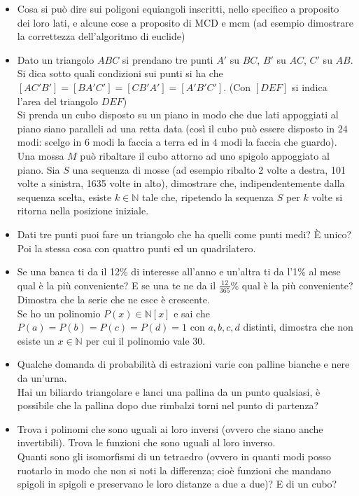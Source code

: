 \documentclass[a4paper,11pt]{article}
\newcommand{\NN}{\mathbb{N}}
\begin{document}
\begin{itemize}
\item Cosa si pu\`o dire sui poligoni equiangoli inscritti, nello specifico a proposito dei loro lati, e alcune cose a proposito di MCD e mcm (ad esempio dimostrare la correttezza dell'algoritmo di euclide)
\item Dato un triangolo $ABC$ si prendano tre punti $A'$ su $BC$, $B'$ su $AC$, $C'$ su $AB$. Si dica sotto quali condizioni sui punti si ha che $[AC'B']=[BA'C']=[CB'A']=[A'B'C']$. (Con $[DEF]$ si indica l'area del triangolo $DEF$) \\ Si prenda un cubo disposto su un piano in modo che due lati appoggiati al piano siano paralleli ad una retta data (cos\`i il cubo pu\`o essere disposto in $24$ modi: scelgo in $6$ modi la faccia a terra ed in $4$ modi la faccia che guardo). Una mossa $M$ pu\`o ribaltare il cubo attorno ad uno spigolo appoggiato al piano. Sia $S$ una sequenza di mosse (ad esempio ribalto 2 volte a destra, 101 volte a sinistra, 1635 volte in alto), dimostrare che, indipendentemente dalla sequenza scelta, esiste $k \in \NN$ tale che, ripetendo la sequenza $S$ per $k$ volte si ritorna nella posizione iniziale.
\item Dati tre punti puoi fare un triangolo che ha quelli come punti medi? \`E unico? Poi la stessa cosa con quattro punti ed un quadrilatero.
\item Se una banca ti da il 12\% di interesse all'anno e un'altra ti da l'1\% al mese qual è la pi\`u conveniente? E se una te ne da il $\frac{12}{365}\%$ qual \`e la pi\`u conveniente? Dimostra che la serie che ne esce \`e crescente. \\ Se ho un polinomio $P(x) \in \NN[x]$ e sai che $P(a) = P(b) = P(c) = P(d) = 1 $ con $a,b,c,d$ distinti, dimostra che non esiste un $x \in \NN$ per cui il polinomio vale 30.
\item Qualche domanda di probabilit\`a di estrazioni varie con palline bianche e nere da un'urna. \\ Hai un biliardo triangolare e lanci una pallina da un punto qualsiasi, \`e possibile che la pallina dopo due rimbalzi torni nel punto di partenza?
\item Trova i polinomi che sono uguali ai loro inversi (ovvero che siano anche invertibili). Trova le funzioni che sono uguali al loro inverso. \\ Quanti sono gli isomorfismi di un tetraedro (ovvero in quanti modi posso ruotarlo in modo che non si noti la differenza; cio\`e funzioni che mandano spigoli in spigoli e preservano le loro distanze a due a due)? E di un cubo?

\end{itemize}
\end{document}
